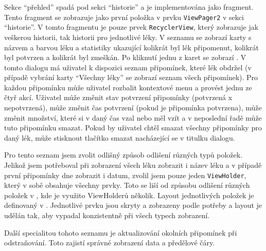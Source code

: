 \documentclass[../TakeYourPill.tex]{subfiles}
\begin{document}
Sekce \enquote{přehled} spadá pod sekci \enquote{historie} a je implementována jako fragment. Tento fragment se zobrazuje jako první položka v prvku \texttt{ViewPager2} v sekci \enquote{historie}. V tomto fragmentu je pouze prvek \texttt{RecyclerView}, který zobrazuje jak veškerou historii, tak historii pro jednotlivé léky. V seznamu se zobrazí karty s názvem a barvou léku a statistiky ukazující kolikrát byl lék připomenut, kolikrát byl potvrzen a kolikrát byl zmeškán. Po kliknutí jednu z karet se zobrazí \label{sec:historydialog}. V tomto dialogu má uživatel k dispozici seznam připomínek, které lék obdržel (v případě vybrání karty \enquote{Všechny léky} se zobrazí seznam všech připomínek). Pro každou připomínku může uživatel rozbalit kontextové menu a provést jednu ze čtyř akcí. Uživatel může změnit stav potvrzení připomínky (potvrzená x nepotvrzená), může změnit čas potvrzení (pokud je připomínka potvrzena), může změnit množství, které si v daný čas vzal nebo měl vzít a v neposlední řadě může tuto připomínku smazat. Pokud by uživatel chtěl smazat všechny připomínky pro daný lék, může stisknout tlačítko smazat nacházející se v titulku dialogu.

Pro tento seznam jsem zvolit odlišný způsob odlišení různých typů položek. Jelikož jsem potřeboval při zobrazení všech léku zobrazit i název léku a v případě první připomínky dne zobrazit i datum, zvolil jsem pouze jeden \texttt{ViewHolder}, který v sobě obsahuje všechny prvky. Toto se liší od způsobu odlišení různých položek v , kde je využito ViewHolderů několik. Layout jednotlivých položek je definovaný v . Jednotlivé prvku jsou skryty a zobrazeny podle potřeby a layout je udělán tak, aby vypadal konzistentně při všech typech zobrazení.

Další specialitou tohoto seznamu je aktualizování okolních připomínek při odstraňování. Toto zajistí správné zobrazení data a předělové čáry.
\end{document}
